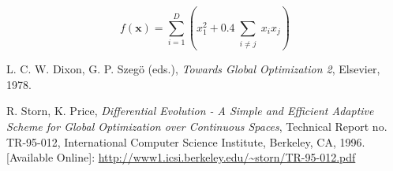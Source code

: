 \documentclass{article}
\begin{document}
	$$
	f(\mathbf{x}) = \sum_{i=1}^D \left(x_1^2 + 0.4 \sum_{\substack{i\neq j}} x_i x_j\right)
	$$
	
	
	\newpage
	
	\begin{thebibliography}{9}
		
		 L. C. W. Dixon, G. P. Szegö (eds.), \textit{Towards Global Optimization 2}, Elsevier, 1978.
		
		 R. Storn, K. Price, \textit{Differential Evolution - A Simple and Efficient Adaptive Scheme for Global Optimization over Continuous Spaces}, Technical Report no. TR-95-012, International Computer Science Institute, Berkeley, CA, 1996. [Available Online]: \url{http://www1.icsi.berkeley.edu/~storn/TR-95-012.pdf}
		
		
	\end{thebibliography}
	
\end{document}
